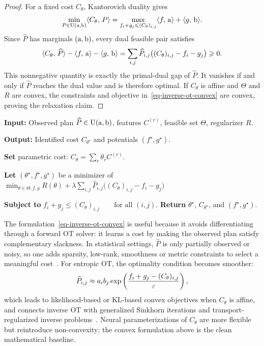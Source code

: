 \begin{proof}
	For a fixed cost $C_\theta$, Kantorovich duality gives
	\[
		\min_{P\in\mathrm{U}(\mathrm{a},\mathrm{b})}\langle C_\theta,\,P\rangle
		=
		\max_{f_i+g_j\leqslant (C_\theta)_{i,j}}
		\langle f,\,\mathrm{a}\rangle+\langle g,\,\mathrm{b}\rangle.
	\]
	Since $\widehat P$ has marginals $(\mathrm{a},\mathrm{b})$, every dual feasible pair satisfies
	\[
		\langle C_\theta,\,\widehat P\rangle-\langle f,\,\mathrm{a}\rangle-\langle g,\,\mathrm{b}\rangle
		=
		\sum_{i,j}\widehat P_{i,j}\big((C_\theta)_{i,j}-f_i-g_j\big)
		\geqslant0.
	\]
	This nonnegative quantity is exactly the primal-dual gap of $\widehat P$. It vanishes if and only if $\widehat P$ reaches the dual value and is therefore optimal. If $C_\theta$ is affine and $\Theta$ and $R$ are convex, the constraints and objective in~\eqref{eq-inverse-ot-convex} are convex, proving the relaxation claim.
\end{proof}

\begin{alg}\label{alg:inverse-ot-dual-gap-learning}
\textbf{Input:} Observed plan $\widehat P\in\mathrm{U}(\mathrm{a},\mathrm{b})$, features $C^{(r)}$, feasible set $\Theta$, regularizer $R$.

\textbf{Output:} Identified cost $C_{\theta^\star}$ and potentials $(f^\star,g^\star)$.

\textbf{Set} parametric cost:
\(C_\theta=\sum_r\theta_r C^{(r)}.\)

\textbf{Let} $(\theta^\star,f^\star,g^\star)$ be a minimizer of
\(\min_{\theta\in\Theta,f,g} R(\theta)+\lambda \sum_{i,j}\widehat P_{i,j}\big((C_\theta)_{i,j}-f_i-g_j\big)\)

\textbf{Subject to}
\(f_i+g_j\leq(C_\theta)_{i,j} \qquad\text{for all }(i,j).\)
\textbf{Return} $\theta^\star$, $C_{\theta^\star}$, and $(f^\star,g^\star)$.
\end{alg}

The formulation~\eqref{eq-inverse-ot-convex} is useful because it avoids differentiating through a forward OT solver: it learns a cost by making the observed plan satisfy complementary slackness. In statistical settings, $\widehat P$ is only partially observed or noisy, so one adds sparsity, low-rank, smoothness or metric constraints to select a meaningful cost~\cite{dupuy2016estimating,andrade2024sparsistency}. For entropic OT, the optimality condition becomes smoother:
\[
	\widehat P_{i,j}\approx a_i b_j
	\exp\left( \frac{f_i+g_j-(C_\theta)_{i,j}}{\varepsilon} \right),
\]
which leads to likelihood-based or KL-based convex objectives when $C_\theta$ is affine, and connects inverse OT with generalized Sinkhorn iterations and transport-regularized inverse problems~\cite{karlsson2016generalized,ma2020learning}. Neural parameterizations of $C_\theta$ are more flexible but reintroduce non-convexity; the convex formulation above is the clean mathematical baseline.


